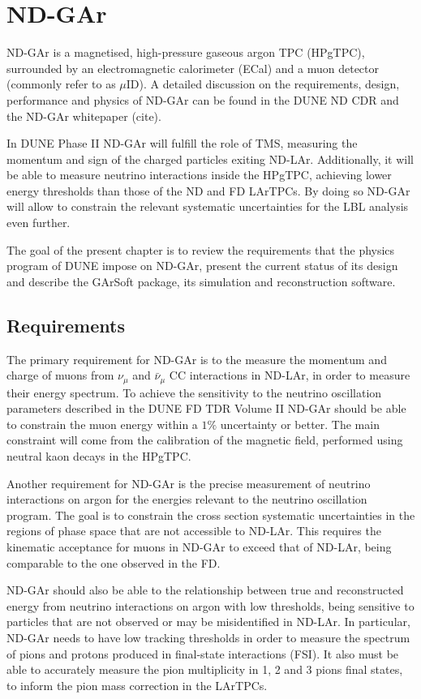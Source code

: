 \chapter{ND-GAr}
\label{chapter:nd_gar}

ND-GAr is a magnetised, high-pressure gaseous argon TPC (HPgTPC), surrounded by an electromagnetic calorimeter (ECal) and a muon detector (commonly refer to as $\mu$ID). A detailed discussion on the requirements, design, performance and physics of ND-GAr can be found in the DUNE ND CDR \cite{DUNE2021NDCDR} and the ND-GAr whitepaper (cite).

In DUNE Phase II ND-GAr will fulfill the role of TMS, measuring the momentum and sign of the charged particles exiting ND-LAr. Additionally, it will be able to measure neutrino interactions inside the HPgTPC, achieving lower energy thresholds than those of the ND and FD LArTPCs. By doing so ND-GAr will allow to constrain the relevant systematic uncertainties for the LBL analysis even further.

The goal of the present chapter is to review the requirements that the physics program of DUNE impose on ND-GAr, present the current status of its design and describe the GArSoft package, its simulation and reconstruction software.

\section{Requirements}

The primary requirement for ND-GAr is to the measure the momentum and charge of muons from $\nu_{\mu}$ and $\bar{\nu}_{\mu}$ CC interactions in ND-LAr, in order to measure their energy spectrum. To achieve the sensitivity to the neutrino oscillation parameters described in the DUNE FD TDR Volume II \cite{DUNE2020TDR2} ND-GAr should be able to constrain the muon energy within a $1\%$ uncertainty or better. The main constraint will come from the calibration of the magnetic field, performed using neutral kaon decays in the HPgTPC.

Another requirement for ND-GAr is the precise measurement of neutrino interactions on argon for the energies relevant to the neutrino oscillation program. The goal is to constrain the cross section systematic uncertainties in the regions of phase space that are not accessible to ND-LAr. This requires the kinematic acceptance for muons in ND-GAr to exceed that of ND-LAr, being comparable to the one observed in the FD.

ND-GAr should also be able to the relationship between true and reconstructed energy from neutrino interactions on argon with low thresholds, being sensitive to particles that are not observed or may be misidentified in ND-LAr. In particular, ND-GAr needs to have low tracking thresholds in order to measure the spectrum of pions and protons produced in final-state interactions (FSI). It also must be able to accurately measure the pion multiplicity in 1, 2 and 3 pions final states, to inform the pion mass correction in the LArTPCs.

